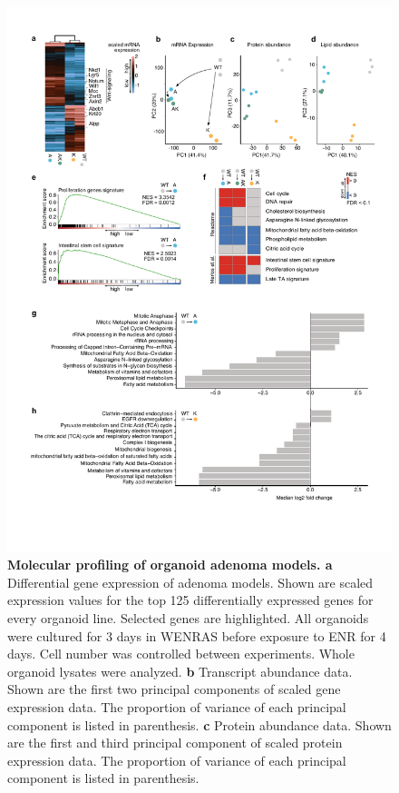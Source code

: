 \begin{flushleft}
\begin{figure}[h]
\centering
\includegraphics[width=\textwidth,
                height=\textheight,
                keepaspectratio]{figures/adenomaprofiling/pdf/fig_1_6.pdf}
\caption{\textbf{Molecular profiling of organoid adenoma models. a} Differential gene expression of adenoma models. Shown are scaled expression values for the top 125 differentially expressed genes for every organoid line. Selected genes are highlighted. All organoids were cultured for 3 days in WENRAS before exposure to ENR for 4 days. Cell number was controlled between experiments. Whole organoid lysates were analyzed. 
\textbf{b} Transcript abundance data. Shown are the first two principal components of scaled gene expression data. The proportion of variance of each principal component is listed in parenthesis. 
\textbf{c} Protein abundance data. Shown are the first and third principal component of scaled protein expression data. The proportion of variance of each principal component is listed in parenthesis. 
}
\end{figure}
\end{flushleft}

